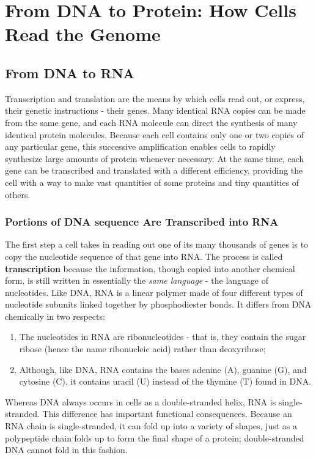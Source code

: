 \chapter{From DNA to Protein: How Cells Read the Genome}

\section{From DNA to RNA}

Transcription and translation are the means by which cells read out, or
express, their genetic instructions - their genes. Many identical RNA copies
can be made from the same gene, and each RNA molecule can direct
the synthesis of many identical protein molecules. Because each cell
contains only one or two copies of any particular gene, this successive
amplification enables cells to rapidly synthesize large amounts of protein
whenever necessary. At the same time, each gene can be transcribed
and translated with a different efficiency, providing the cell with a way
to make vast quantities of some proteins and tiny quantities of others.

\subsection{Portions of DNA sequence Are Transcribed into RNA}

The first step a cell takes in reading out one of its many thousands of
genes is to copy the nucleotide sequence of that gene into RNA. The process
is called \textbf{transcription} because the information, though copied into
another chemical form, is still written in essentially the \textit{same language} -
the language of nucleotides. Like DNA, RNA is a linear polymer made of
four different types of nucleotide subunits linked together by phosphodiester
bonds. It differs from DNA chemically in two respects:

\begin{enumerate}
\item The nucleotides in RNA are ribonucleotides - that is, they contain the
sugar ribose (hence the name ribonucleic acid) rather than deoxyribose;
\item Although, like DNA, RNA contains the bases adenine (A), guanine (G),
and cytosine (C), it contains uracil (U) instead of the thymine (T) found
in DNA.
\end{enumerate}

Whereas DNA always occurs in cells as a
double-stranded helix, RNA is single-stranded. This difference has important
functional consequences. Because an RNA chain is single-stranded,
it can fold up into a variety of shapes, just as a polypeptide chain folds
up to form the final shape of a protein; double-stranded DNA cannot fold in this fashion.

